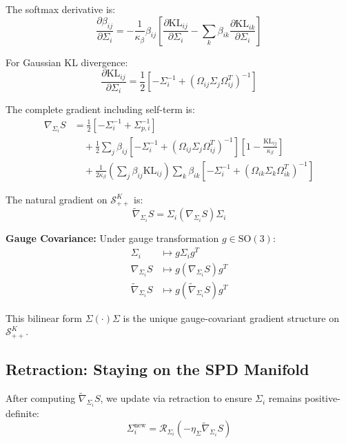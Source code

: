 \documentclass[11pt]{article}
\begin{document}
The softmax derivative is:
\begin{equation}
\frac{\partial \beta_{ij}}{\partial \Sigma_i} = -\frac{1}{\kappa_\beta} \beta_{ij} \left[\frac{\partial \mathrm{KL}_{ij}}{\partial \Sigma_i} - \sum_k \beta_{ik} \frac{\partial \mathrm{KL}_{ik}}{\partial \Sigma_i}\right]
\end{equation}

For Gaussian KL divergence:
\begin{equation}
\frac{\partial \mathrm{KL}_{ij}}{\partial \Sigma_i} = \frac{1}{2}\left[-\Sigma_i^{-1} + (\Omega_{ij}\Sigma_j\Omega_{ij}^T)^{-1}\right]
\end{equation}

The complete gradient including self-term is:
\begin{align}
\nabla_{\Sigma_i} S &= \frac{1}{2}\left[-\Sigma_i^{-1} + \Sigma_{p,i}^{-1}\right] \nonumber \\
&\quad + \frac{1}{2}\sum_j \beta_{ij} \left[-\Sigma_i^{-1} + (\Omega_{ij}\Sigma_j\Omega_{ij}^T)^{-1}\right]\left[1 - \frac{\mathrm{KL}_{ij}}{\kappa_\beta}\right] \nonumber \\
&\quad + \frac{1}{2\kappa_\beta}\left(\sum_j \beta_{ij}\mathrm{KL}_{ij}\right) \sum_k \beta_{ik} \left[-\Sigma_i^{-1} + (\Omega_{ik}\Sigma_k\Omega_{ik}^T)^{-1}\right]
\end{align}

The natural gradient on $\mathcal{S}_{++}^K$ is:
\begin{equation}
\tilde{\nabla}_{\Sigma_i} S = \Sigma_i (\nabla_{\Sigma_i} S) \Sigma_i
\end{equation}

\textbf{Gauge Covariance:} Under gauge transformation $g \in \mathrm{SO}(3)$:
\begin{align}
\Sigma_i &\mapsto g\Sigma_i g^T \\
\nabla_{\Sigma_i} S &\mapsto g(\nabla_{\Sigma_i} S)g^T \\
\tilde{\nabla}_{\Sigma_i} S &\mapsto g(\tilde{\nabla}_{\Sigma_i} S)g^T
\end{align}

This bilinear form $\Sigma (\cdot) \Sigma$ is the unique gauge-covariant gradient structure on $\mathcal{S}_{++}^K$.

\subsection*{Retraction: Staying on the SPD Manifold}

After computing $\tilde{\nabla}_{\Sigma_i} S$, we update via retraction to ensure $\Sigma_i$ remains positive-definite:
\begin{equation}
\Sigma_i^{\mathrm{new}} = \mathcal{R}_{\Sigma_i}(-\eta_\Sigma \tilde{\nabla}_{\Sigma_i} S)
\end{equation}
\end{document}
